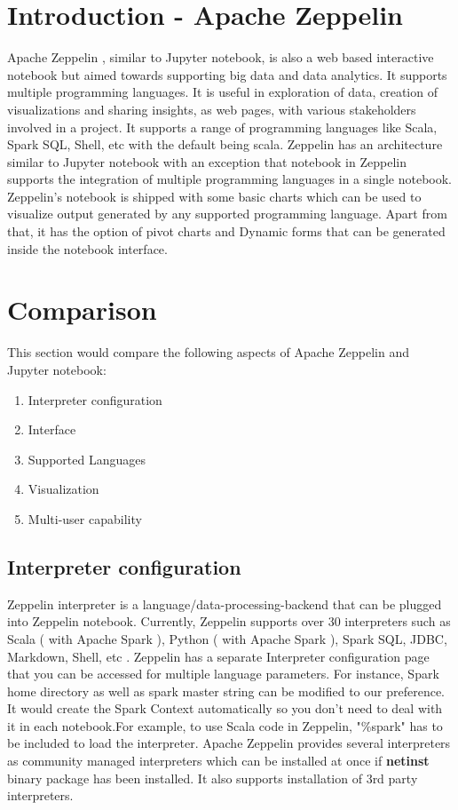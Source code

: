 \documentclass[9pt,twocolumn,twoside]{ ../../styles/osajnl}
\begin{document}
\section{Introduction - Apache Zeppelin}

Apache Zeppelin \cite{www-zeppelin}, similar to Jupyter notebook, is also a web based interactive notebook but aimed towards supporting big data and data analytics. It supports multiple programming languages. It is useful in exploration of data, creation of visualizations and sharing insights, as web pages, with various stakeholders involved in a project. It supports a range of programming languages like Scala, Spark SQL, Shell, etc with the default being scala. Zeppelin has an architecture similar to Jupyter notebook with an exception that notebook in Zeppelin supports the integration of multiple programming languages in a single notebook. Zeppelin's notebook is shipped with some basic charts which can be used to visualize output generated by any supported programming language. Apart from that, it has the option of pivot charts and Dynamic forms that can be generated inside the notebook interface. 

\section{Comparison}

This section would compare the following aspects of Apache Zeppelin and Jupyter notebook:
\begin{enumerate}
    \item Interpreter configuration
    \item Interface
    \item Supported Languages
    \item Visualization
    \item Multi-user capability
\end{enumerate}

\subsection{Interpreter configuration}

Zeppelin interpreter is a language/data-processing-backend that can be plugged into Zeppelin notebook. Currently, Zeppelin supports over 30 interpreters such as Scala ( with Apache Spark ), Python ( with Apache Spark ), Spark SQL, JDBC, Markdown, Shell, etc \cite{www-zeppelin-int}. Zeppelin has a separate Interpreter configuration page that you can be accessed for multiple language parameters. For instance, Spark home directory as well as spark master string can be modified to our preference. It would create the Spark Context automatically so you don't need to deal with it in each notebook.For example, to use Scala code in Zeppelin, "\%spark" has to be included to load the interpreter. Apache Zeppelin provides several interpreters as community managed interpreters \cite{www-zeppelin-int-install} which can be installed at once if \textbf{netinst} binary package has been installed. It also supports installation of 3rd party interpreters.\\
\end{document}
